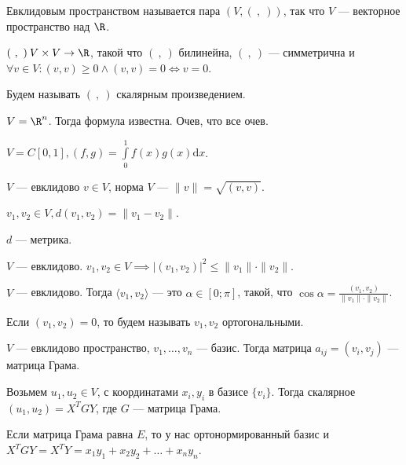 \begin{definition}
    Евклидовым пространством называется пара $(V, (\ ,\ ))$, так что $V$ --- векторное пространство над  $\R$.

    $(\ ,\ )\: V \times V \to \R$, такой что  $(\ ,\ )$ билинейна,  $(\ ,\ )$ --- симметрична и  $\forall v \in V\!: (v, v) \ge 0 \land (v, v) = 0 \iff v = 0$.

    Будем называть $(\ ,\ )$ скалярным произведением.
\end{definition}
\begin{example}
    $V=\R^n$. Тогда формула известна. Очев, что все очев.
\end{example}
\begin{example}
    $V = C[0, 1], (f, g) = \int\limits_0^{1}f(x)g(x) \mathrm{d}x$.
\end{example}
\begin{definition}
    $V$ --- евклидово  $v \in V$, норма  $V$ --- $\|v\| = \sqrt{(v, v)}$.

     $v_1, v_2 \in V, d(v_1, v_2) = \|v_1 - v_2\|$.
\end{definition}
\begin{statement}
    $d$ --- метрика.
\end{statement}
\begin{statement}
    $V$ --- евклидово. $v_1, v_2 \in V \implies |(v_1,v_2)|^2 \le \|v_1\| \cdot \|v_2\|$.
\end{statement}
\begin{definition}
    $V$ --- евклидово. Тогда  $\langle v_1, v_2 \rangle$ --- это $\alpha \in [0; \pi]$,  такой, что  $\cos \alpha = \frac{(v_1, v_2)}{\|v_1\| \cdot \|v_2\|}$. 
\end{definition}
\begin{definition}
    Если $(v_1, v_2) = 0$, то будем называть $v_1, v_2$ ортогональными.
\end{definition}
\begin{definition}
    $V$ --- евклидово пространство,  $v_1, \ldots, v_n$ --- базис. Тогда матрица $a_{ij} = (v_i, v_j)$ --- матрица Грама.
\end{definition}

Возьмем $u_1, u_2 \in V$, с координатами $x_i, y_i$ в базисе  $\{v_i\}$. Тогда скалярное  $(u_1, u_2) = X^TGY$, где $G$ --- матрица Грама.

Если матрица Грама равна  $E$, то у нас ортонормированный базис и $X^TGY = X^TY=x_1y_1 + x_2y_2 + \ldots + x_ny_n$.

